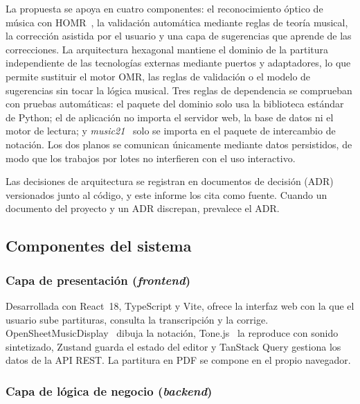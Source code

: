 \documentclass[conference]{IEEEtran}
\begin{document}
La propuesta se apoya en cuatro componentes: el reconocimiento óptico de
música con HOMR~\cite{homr2024}, la validación automática mediante reglas
de teoría musical, la corrección asistida por el usuario y una capa de
sugerencias que aprende de las correcciones. La arquitectura hexagonal
mantiene el dominio de la partitura independiente de las tecnologías
externas mediante puertos y adaptadores, lo que permite sustituir el motor
OMR, las reglas de validación o el modelo de sugerencias sin tocar la
lógica musical. Tres reglas de dependencia se comprueban con pruebas
automáticas: el paquete del dominio solo usa la biblioteca estándar de
Python; el de aplicación no importa el servidor web, la base de datos ni el
motor de lectura; y \textit{music21}~\cite{cuthbert2010} solo se importa en
el paquete de intercambio de notación.
Los dos planos se comunican únicamente mediante datos persistidos, de modo
que los trabajos por lotes no interfieren con el uso interactivo.

Las decisiones de arquitectura se registran en documentos de decisión (ADR)
versionados junto al código, y este informe los cita como fuente. Cuando un
documento del proyecto y un ADR discrepan, prevalece el ADR.

\subsection{Componentes del sistema}

\subsubsection{Capa de presentación (\textit{frontend})}

Desarrollada con React~18, TypeScript y Vite, ofrece la interfaz web con la
que el usuario sube partituras, consulta la transcripción y la corrige.
OpenSheetMusicDisplay~\cite{osmd} dibuja la notación, Tone.js~\cite{tonejs}
la reproduce con sonido sintetizado, Zustand guarda el estado del editor y
TanStack Query gestiona los datos de la API REST. La partitura en PDF se
compone en el propio navegador.

\subsubsection{Capa de lógica de negocio (\textit{backend})}
\end{document}
